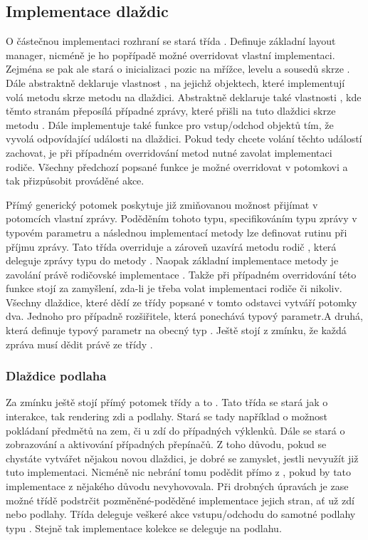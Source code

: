 \subsection{Implementace dlaždic}
O částečnou implementaci rozhraní  se stará třída . Definuje základní layout manager,
nicméně je ho popřípadě možné overridovat vlastní implementaci. Zejména se pak ale stará o inicializaci 
pozic na mřížce, levelu a sousedů skrze . Dále abstraktně deklaruje vlastnost
, na jejichž objektech, které implementují  volá metodu  skrze
metodu  na dlaždici. Abstraktně deklaruje také vlastnosti , kde těmto stranám přeposílá 
případné zprávy, které přišli na tuto dlaždici skrze metodu . Dále implementuje
také funkce pro vstup/odchod objektů tím, že vyvolá odpovídající události na dlaždici. Pokud tedy chcete
volání těchto událostí zachovat, je při případném overridování metod nutné zavolat implementaci rodiče. Všechny
předchozí popsané funkce je možné overridovat v potomkovi a tak přizpůsobit prováděné akce.

Přímý generický potomek  poskytuje již zmiňovanou možnost přijímat
v potomcích vlastní zprávy. Poděděním tohoto typu, specifikováním typu zprávy v typovém parametru a následnou implementací metody 
 lze definovat rutinu při příjmu zprávy. Tato třída overriduje a zároveň uzavírá metodu rodič ,
která deleguje zprávy typu  do metody . Naopak základní implementace metody 
je zavolání právě rodičovské implementace . Takže při případném overridování této funkce
stojí za zamyšlení, zda-li  je třeba volat implementaci rodiče či nikoliv. Všechny dlaždice, které dědí ze třídy
popsané v tomto odstavci vytváří potomky dva. Jednoho pro případně rozšiřitele, která ponechává 
typový parametr.A druhá, která definuje typový parametr na obecný typ . Ještě stojí z zmínku,
že každá zpráva musí dědit právě ze třídy .

\subsubsection{Dlaždice podlaha}
Za zmínku ještě stojí přímý potomek třídy  a 
to .  Tato třída se stará jak o interakce, tak rendering
zdi a podlahy. Stará se tady například o možnost pokládaní předmětů na zem, či u zdí do případných výklenků. 
Dále se stará  o zobrazování a aktivování případných přepínačů. Z toho důvodu, pokud se chystáte
vytvářet nějakou novou dlaždici, je dobré se zamyslet, jestli  nevyužít již tuto implementaci. Nicméně nic
nebrání tomu podědit přímo z , pokud by tato implementace z
nějakého důvodu nevyhovovala. Při drobných úpravách je zase možné třídě podstrčit pozměněné-poděděné implementace 
jejich stran, ať už zdí nebo podlahy. Třída deleguje veškeré akce vstupu/odchodu do samotné podlahy
typu . Stejně tak implementace kolekce   se deleguje na podlahu.


